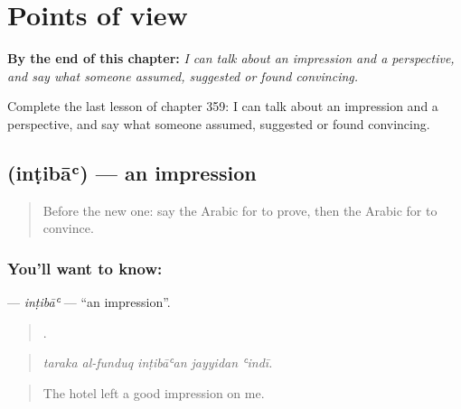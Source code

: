 
\chapter{Points of view}
\label{ch:ar-points-of-view}

\begin{chapteropening}
\textbf{By the end of this chapter:} \emph{I can talk about an impression and a perspective, and say what someone assumed, suggested or found convincing.}

Complete the last lesson of chapter 359: I can talk about an impression and a perspective, and say what someone assumed, suggested or found convincing.
\end{chapteropening}

\section[\texorpdfstring{\ar{انطباع} (inṭibāʿ)}{انطباع (inṭibāʿ)}]{ (inṭibāʿ) — an impression}

\label{lesson:AR-C359-intiba}



\begin{quote}
Before the new one: say the Arabic for to prove, then the Arabic for to convince.
\end{quote}

\subsection*{You'll want to know: }
\textbf{} — \emph{inṭibāʿ} — \textquotedblleft{}an impression\textquotedblright{}.

\begin{quote}
    .
\end{quote}

\begin{quote}
\emph{taraka al-funduq inṭibāʿan jayyidan ʿindī.}
\end{quote}

\begin{quote}
The hotel left a good impression on me.
\end{quote}

